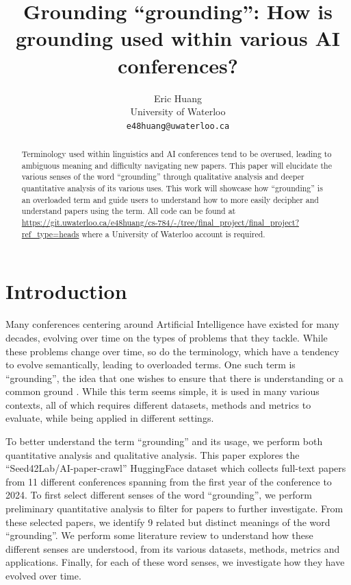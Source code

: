 \documentclass[11pt]{article}
\title{Grounding ``grounding'': How is grounding used within various AI conferences?}
\author{Eric Huang \\
  University of Waterloo\\
  \texttt{e48huang@uwaterloo.ca}}
\begin{document}
\maketitle
\begin{abstract}
Terminology used within linguistics and AI conferences tend to be overused, leading to ambiguous meaning and difficulty navigating new papers. This paper will elucidate the various senses of the word ``grounding'' through qualitative analysis and deeper quantitative analysis of its various uses. This work will showcase how ``grounding'' is an overloaded term and guide users to understand how to more easily decipher and understand papers using the term. All code can be found at \url{https://git.uwaterloo.ca/e48huang/cs-784/-/tree/final_project/final_project?ref_type=heads} where a University of Waterloo account is required.
\end{abstract}

\section{Introduction}
Many conferences centering around Artificial Intelligence have existed for many decades, evolving over time on the types of problems that they tackle. While these problems change over time, so do the terminology, which have a tendency to evolve semantically, leading to overloaded terms. One such term is ``grounding'', the idea that one wishes to ensure that there is understanding or a common ground \cite{nakano-etal-2003-towards}. While this term seems simple, it is used in many various contexts, all of which requires different datasets, methods and metrics to evaluate, while being applied in different settings.

To better understand the term ``grounding'' and its usage, we perform both quantitative analysis and qualitative analysis. This paper explores the ``Seed42Lab/AI-paper-crawl'' HuggingFace dataset \cite{ai-paper-crawl} which collects full-text papers from 11 different conferences spanning from the first year of the conference to 2024. To first select different senses of the word ``grounding'', we perform preliminary quantitative analysis to filter for papers to further investigate. From these selected papers, we identify 9 related but distinct meanings of the word ``grounding''. We perform some literature review to understand how these different senses are understood, from its various datasets, methods, metrics and applications. Finally, for each of these word senses, we investigate how they have evolved over time.
\end{document}
